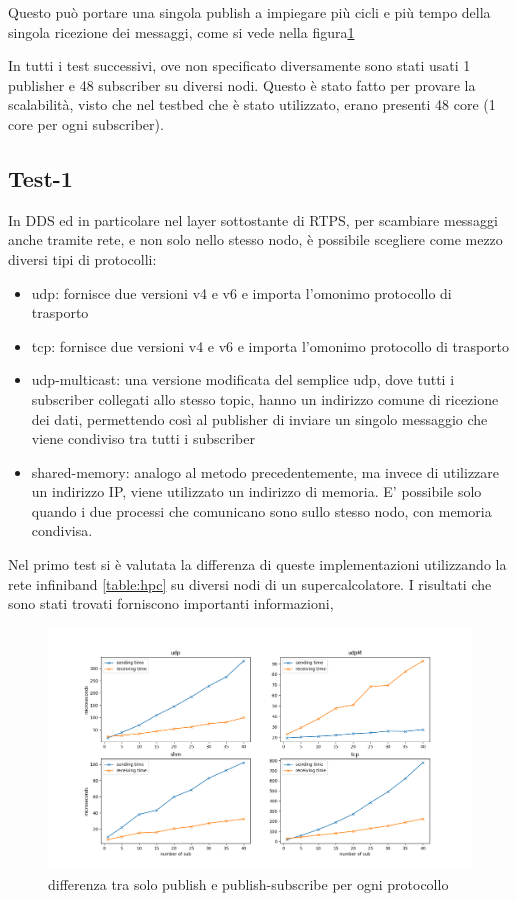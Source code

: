 Questo può portare una singola publish a impiegare più cicli e più tempo della singola ricezione dei messaggi, come si vede nella figura\ref{fig:test3_different_protocols}

In tutti i test successivi, ove non specificato diversamente sono stati usati 1 publisher e 48 subscriber su diversi nodi. Questo è stato fatto per provare la scalabilità, visto che nel testbed che è stato utilizzato, erano presenti 48 core (1 core per ogni subscriber).

\subsection{Test-1}
In DDS ed in particolare nel layer sottostante di RTPS, per scambiare messaggi anche tramite rete, e non solo nello stesso nodo, è possibile scegliere come mezzo diversi tipi di protocolli:

\begin{itemize}
    \item udp: fornisce due versioni v4 e v6 e importa l'omonimo protocollo di trasporto
    \item tcp: fornisce due versioni v4 e v6 e importa l'omonimo protocollo di trasporto
    \item udp-multicast: una versione modificata del semplice udp, dove tutti i subscriber collegati allo stesso topic, hanno un indirizzo comune di ricezione dei dati, permettendo così al publisher di inviare un singolo messaggio che viene condiviso tra tutti i subscriber  %
    \item shared-memory: analogo al metodo precedentemente, ma invece di utilizzare un indirizzo IP, viene utilizzato un indirizzo di memoria. E' possibile solo quando i due processi che comunicano sono sullo stesso nodo, con memoria condivisa.
\end{itemize}

Nel primo test si è valutata la differenza di queste implementazioni utilizzando la rete infiniband \ref{table:hpc} su diversi nodi di un supercalcolatore. I risultati che sono stati trovati forniscono importanti informazioni, %

\begin{figure}[H]
    \includegraphics[width=\textwidth]{./results/test3_different_protocol_send_receive.png} %
        \caption{differenza tra solo publish e publish-subscribe per ogni protocollo}
        \label{fig:test3_different_protocols}
\end{figure}

